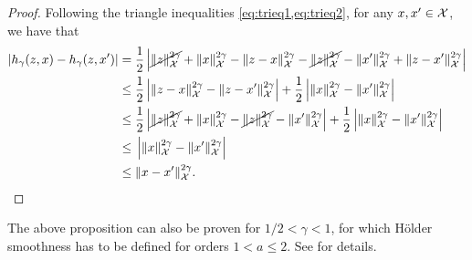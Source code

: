 \begin{proof}
  Following the triangle inequalities \cref{eq:trieq1,eq:trieq2}, for any $x,x'\in{\mathcal X}$, we have that
  \begin{align*}
    \left\vert h_\gamma(z,x) - h_\gamma(z,x') \right\vert
    ={}& \frac{1}{2} \left\vert 
    \cancel{\lVert z\rVert_{\mathcal X}^{2\gamma}} 
    + \lVert x\rVert_{\mathcal X}^{2\gamma} 
    - \lVert z-x\rVert_{\mathcal X}^{2\gamma} 
    - \cancel{\lVert z\rVert_{\mathcal X}^{2\gamma}} 
    - \lVert x'\rVert_{\mathcal X}^{2\gamma} 
    + \lVert z-x'\rVert_{\mathcal X}^{2\gamma} \right\vert \\
    \leq{}& \frac{1}{2} \left\vert \lVert z-x\rVert_{\mathcal X}^{2\gamma} - \lVert z-x'\rVert_{\mathcal X}^{2\gamma} \right\vert 
    + \frac{1}{2} \left\vert \lVert x\rVert_{\mathcal X}^{2\gamma} - \lVert x'\rVert_{\mathcal X}^{2\gamma}  \right\vert \\
    \leq{}& \frac{1}{2} \left\vert \cancel{\lVert z\rVert_{\mathcal X}^{2\gamma}} + \lVert x\rVert_{\mathcal X}^{2\gamma} - \cancel{\lVert z\rVert_{\mathcal X}^{2\gamma}} - \lVert x'\rVert_{\mathcal X}^{2\gamma} \right\vert 
    + \frac{1}{2} \left\vert \lVert x\rVert_{\mathcal X}^{2\gamma} - \lVert x'\rVert_{\mathcal X}^{2\gamma}  \right\vert \\
    \leq{}& \left\vert \lVert x\rVert_{\mathcal X}^{2\gamma} - \lVert x'\rVert_{\mathcal X}^{2\gamma}  \right\vert \\
    \leq{}& \lVert x-x'\rVert_{\mathcal X}^{2\gamma}. \qedhere
  \end{align*}
\end{proof}

\begin{remark}
  The above proposition can also be proven for $1/2<\gamma<1$, for which Hölder smoothness has to be defined for orders $1<a\leq 2$.
  See \citep[Lemma 9]{bergsma2017} for details.
\end{remark}



